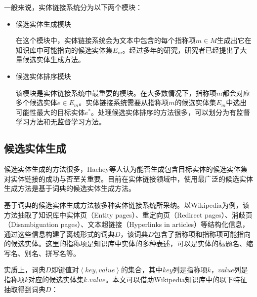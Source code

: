 一般来说，实体链接系统分为以下两个模块：
\begin{itemize}
	\item {候选实体生成模块
	
在这个模块中，实体链接系统会为文本中包含的每个指称项$m \in M$生成出它在知识库中可能指向的候选实体集$E_m$。经过多年的研究，研究者已经提出了大量候选实体生成方法。
}
	\item {候选实体排序模块
	
	该模块是实体链接系统中最重要的模块。在大多数情况下，指称项$m$都会对应多个候选实体$e\in E_m$。实体链接系统需要从指称项$m$的候选实体集$E_m$中选出可能性最大的目标实体$e^*$。处理候选实体排序的方法很多，可以划分为有监督学习方法和无监督学习方法。
}
\end{itemize}

\subsection{候选实体生成}\label{section:candidate_generate}
候选实体生成的方法很多，Hachey等人\cite{EELWW}认为能否生成包含目标实体的候选实体集对实体链接的成功与否至关重要。目前在实体链接领域中，使用最广泛的候选实体生成方法是基于词典的候选实体生成方法。

基于词典的候选实体生成方法被多种实体链接系统\cite{CELWTGBM,ELFEEKB}所采纳。以Wikipedia为例，该方法抽取了知识库中实体页（Entity pages）、重定向页（Redirect pages）、消歧页（Disambiguation pages）、文本超链接（Hyperlinks in articles）等结构化信息，通过这些信息构建了离线形式的词典$D$，该词典$D$包含了指称项和指称项可能指向的候选实体。这里的指称项是知识库中实体的多种表述，可以是实体的标题名、缩写名、别名、拼写名等。

实质上，词典$D$即键值对$\left\langle key,value\right\rangle $的集合，其中$key$列是指称项$k$，$value$列是指称项$k$对应的候选实体集$k.value$。本文可以借助Wikipedia知识库中的以下特征抽取得到词典$D$：

